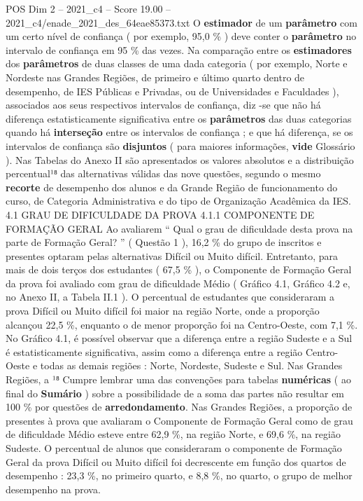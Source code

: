 \begin{textsample}{POS Dim 2 – 2021\_c4 – Score 19.00 – 2021\_c4/enade\_2021\_des\_64eae85373.txt}
O \textbf{estimador} de um \textbf{parâmetro} com um certo nível de confiança ( por exemplo, 95,0 \% ) deve conter o \textbf{parâmetro} no intervalo de confiança em 95 \% das vezes.
Na comparação entre os \textbf{estimadores} dos \textbf{parâmetros} de duas classes de uma dada categoria ( por exemplo, Norte e Nordeste nas Grandes Regiões, de primeiro e último quarto dentro de desempenho, de IES Públicas e Privadas, ou de Universidades e Faculdades ), associados aos seus respectivos intervalos de confiança, diz -se que não há diferença estatisticamente significativa entre os \textbf{parâmetros} das duas categorias quando há \textbf{interseção} entre os intervalos de confiança ; e que há diferença, se os intervalos de confiança são \textbf{disjuntos} ( para maiores informações, \textbf{vide} Glossário ).
Nas Tabelas do Anexo II são apresentados os valores absolutos e a distribuição percentual¹⁸ das alternativas válidas das nove questões, segundo o mesmo \textbf{recorte} de desempenho dos alunos e da Grande Região de funcionamento do curso, de Categoria Administrativa e do tipo de Organização Acadêmica da IES. 4.1 GRAU DE DIFICULDADE DA PROVA 4.1.1 COMPONENTE DE FORMAÇÃO GERAL Ao avaliarem “ Qual o grau de dificuldade desta prova na parte de Formação Geral? ” ( Questão 1 ), 16,2 \% do grupo de inscritos e presentes optaram pelas alternativas Difícil ou Muito difícil.
Entretanto, para mais de dois terços dos estudantes ( 67,5 \% ), o Componente de Formação Geral da prova foi avaliado com grau de dificuldade Médio ( Gráfico 4.1, Gráfico 4.2 e, no Anexo II, a Tabela II.1 ).
O percentual de estudantes que consideraram a prova Difícil ou Muito difícil foi maior na região Norte, onde a proporção alcançou 22,5 \%, enquanto o de menor proporção foi na Centro-Oeste, com 7,1 \%.
No Gráfico 4.1, é possível observar que a diferença entre a região Sudeste e a Sul é estatisticamente significativa, assim como a diferença entre a região Centro-Oeste e todas as demais regiões : Norte, Nordeste, Sudeste e Sul.
Nas Grandes Regiões, a ¹⁸ Cumpre lembrar uma das convenções para tabelas \textbf{numéricas} ( ao final do \textbf{Sumário} ) sobre a possibilidade de a soma das partes não resultar em 100 \% por questões de \textbf{arredondamento}.
Nas Grandes Regiões, a proporção de presentes à prova que avaliaram o Componente de Formação Geral como de grau de dificuldade Médio esteve entre 62,9 \%, na região Norte, e 69,6 \%, na região Sudeste.
O percentual de alunos que consideraram o componente de Formação Geral da prova Difícil ou Muito difícil foi decrescente em função dos quartos de desempenho : 23,3 \%, no primeiro quarto, e 8,8 \%, no quarto, o grupo de melhor desempenho na prova.

\end{textsample}
